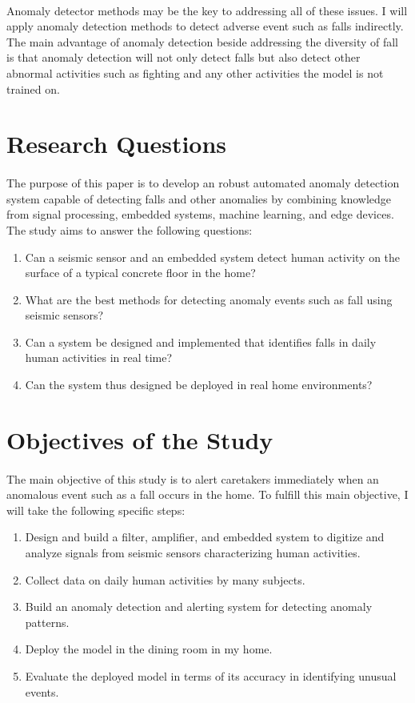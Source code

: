\paragraph{}
Anomaly detector methods may be the key to addressing all of these issues. I will apply  anomaly detection methods to detect adverse event such as falls indirectly. The main advantage of anomaly detection beside addressing the diversity of fall is that anomaly detection will not only detect falls but also detect other abnormal activities such as fighting and any other activities the model is not trained on.


\section{Research Questions}
\paragraph{}
The purpose of this paper is to develop an robust automated anomaly detection system capable of detecting falls and other anomalies by combining knowledge from signal processing, embedded systems, machine learning, and edge devices. The study aims to answer the following questions:
\begin{enumerate}
\item Can a seismic sensor and an embedded system detect human activity on the surface of a typical concrete floor in the home?
\item What are the best methods for detecting anomaly events such as fall using seismic sensors?
\item Can a system be designed and implemented that identifies falls in daily human activities in real time?
\item Can the system thus designed be deployed in real home environments?
\end{enumerate}

\section{Objectives of the Study}
\paragraph{}
The main objective of this study is to alert caretakers immediately when an anomalous event such as a fall occurs in the home. To fulfill this main objective, I will take the following specific steps:
\begin{enumerate}
\item Design and build a filter, amplifier, and embedded system to digitize and analyze signals from seismic sensors characterizing human activities.
\item Collect data on daily human activities by many subjects.
\item Build an anomaly detection and alerting system for detecting anomaly patterns.
\item Deploy the model in the dining room in my home.
\item Evaluate the deployed model in terms of its accuracy in identifying unusual events.
\end{enumerate}

